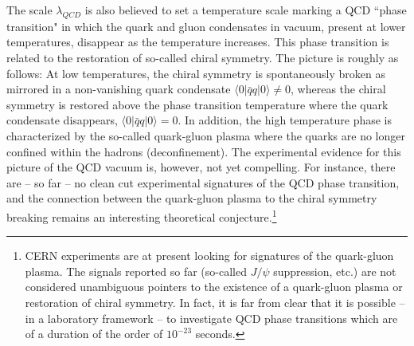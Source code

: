 \documentclass[12pt]{article}
\begin{document}
The scale $\lambda_{QCD}$ is also believed to set a temperature scale
marking a QCD ``phase transition" in which the quark and gluon
condensates in vacuum, present at lower temperatures, disappear as the
temperature increases. This phase transition is related to the
restoration of so-called chiral symmetry.  The picture is roughly as
follows: At low temperatures, the chiral symmetry is spontaneously
broken as mirrored in a non-vanishing quark condensate $\langle 0 |\bar{q} q
| 0 \rangle  \neq 0$, whereas the chiral symmetry is restored above the phase
transition temperature where the quark condensate disappears, $\langle 0 |
\bar{q} q | 0 \rangle  = 0$. In addition, the high temperature phase is
characterized by the so-called quark-gluon plasma where the quarks are
no longer confined within the hadrons (deconfinement).
The experimental evidence for this picture of the QCD vacuum is,
however, not yet compelling.  For instance, there are -- so far -- no
clean cut experimental signatures of the QCD phase transition, and the
connection between the quark-gluon plasma to the chiral symmetry
breaking remains an interesting theoretical conjecture.\footnote{CERN
experiments are at present looking for signatures of the quark-gluon
plasma. The signals reported so far (so-called $J/\psi$ suppression,
etc.) are not considered unambiguous pointers to the existence of a
quark-gluon plasma or restoration of chiral symmetry. In fact, it is
far from clear that it is possible -- in a laboratory framework -- to
investigate QCD phase transitions which are of a duration of the order
of $10^{-23}$ seconds.}
\end{document}
